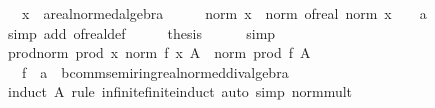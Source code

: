 \begin{isabellebody}
\ \ \ x\ {\isacharcolon}{\kern0pt}{\isacharcolon}{\kern0pt}\ {\isachardoublequoteopen}{\isacharprime}{\kern0pt}a{\isacharcolon}{\kern0pt}{\isacharcolon}{\kern0pt}real{\isacharunderscore}{\kern0pt}normed{\isacharunderscore}{\kern0pt}algebra{\isacharunderscore}{\kern0pt}{}{\isachardoublequoteclose}\isanewline
%
\isadelimproof
%
\endisadelimproof
%
\isatagproof
{}\isamarkupfalse%
\ {\isacharminus}{\kern0pt}\isanewline
\ \ \isamarkupfalse%
\ {\isachardoublequoteopen}norm\ x\ {\isacharless}{\kern0pt}\ norm\ {\isacharparenleft}{\kern0pt}of{\isacharunderscore}{\kern0pt}real\ {\isacharparenleft}{\kern0pt}norm\ x\ {\isacharplus}{\kern0pt}\ {}{\isacharparenright}{\kern0pt}\ {\isacharcolon}{\kern0pt}{\isacharcolon}{\kern0pt}\ {\isacharprime}{\kern0pt}a{\isacharparenright}{\kern0pt}{\isachardoublequoteclose}\isanewline
\ \ \ \ \isamarkupfalse%
\ {\isacharparenleft}{\kern0pt}simp\ add{\isacharcolon}{\kern0pt}\ of{\isacharunderscore}{\kern0pt}real{\isacharunderscore}{\kern0pt}def{\isacharparenright}{\kern0pt}\isanewline
\ \ \isamarkupfalse%
\ \isamarkupfalse%
\ {\isacharquery}{\kern0pt}thesis\isanewline
\ \ \ \ \isamarkupfalse%
\ simp\isanewline
{}\isamarkupfalse%
%
\endisatagproof
{\isafoldproof}%
%
\isadelimproof
\isanewline
%
\endisadelimproof
\isanewline
{}\isamarkupfalse%
\ prod{\isacharunderscore}{\kern0pt}norm{\isacharcolon}{\kern0pt}\ {\isachardoublequoteopen}prod\ {\isacharparenleft}{\kern0pt}{\isasymlambda}x{\isachardot}{\kern0pt}\ norm\ {\isacharparenleft}{\kern0pt}f\ x{\isacharparenright}{\kern0pt}{\isacharparenright}{\kern0pt}\ A\ {\isacharequal}{\kern0pt}\ norm\ {\isacharparenleft}{\kern0pt}prod\ f\ A{\isacharparenright}{\kern0pt}{\isachardoublequoteclose}\isanewline
\ \ \ f\ {\isacharcolon}{\kern0pt}{\isacharcolon}{\kern0pt}\ {\isachardoublequoteopen}{\isacharprime}{\kern0pt}a\ {\isasymRightarrow}\ {\isacharprime}{\kern0pt}b{\isacharcolon}{\kern0pt}{\isacharcolon}{\kern0pt}{\isacharbraceleft}{\kern0pt}comm{\isacharunderscore}{\kern0pt}semiring{\isacharunderscore}{\kern0pt}{}{\isacharcomma}{\kern0pt}real{\isacharunderscore}{\kern0pt}normed{\isacharunderscore}{\kern0pt}div{\isacharunderscore}{\kern0pt}algebra{\isacharbraceright}{\kern0pt}{\isachardoublequoteclose}\isanewline
%
\isadelimproof
\ \ %
\endisadelimproof
%
\isatagproof
{}\isamarkupfalse%
\ {\isacharparenleft}{\kern0pt}induct\ A\ rule{\isacharcolon}{\kern0pt}\ infinite{\isacharunderscore}{\kern0pt}finite{\isacharunderscore}{\kern0pt}induct{\isacharparenright}{\kern0pt}\ {\isacharparenleft}{\kern0pt}auto\ simp{\isacharcolon}{\kern0pt}\ norm{\isacharunderscore}{\kern0pt}mult{\isacharparenright}{\kern0pt}%

\end{isabellebody}
